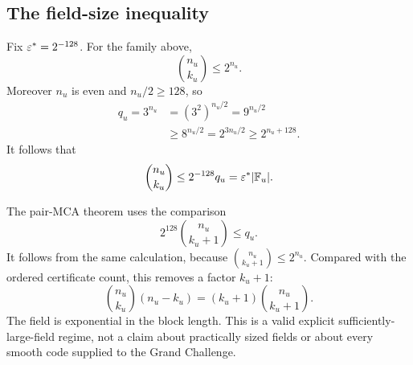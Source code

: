 \subsection{The field-size inequality}
\label{sec:field-inequality}

Fix \(\varepsilon^\ast=2^{-128}\).  For the family above,
\[
  \binom{n_u}{k_u}\le 2^{n_u}.
\]
Moreover \(n_u\) is even and \(n_u/2\ge128\), so
\[
\begin{aligned}
  q_u=3^{n_u}
  &=(3^2)^{n_u/2}
    =9^{n_u/2}                                      \\
  &\ge8^{n_u/2}
    =2^{3n_u/2}
    \ge2^{n_u+128}.
\end{aligned}
\]
It follows that
\[
  \binom{n_u}{k_u}
  \le 2^{-128}q_u
  =\varepsilon^\ast|\mathbb{F}_u|.
\]

The pair-MCA theorem uses the comparison
\[
  2^{128}\binom{n_u}{k_u+1}\le q_u.
\]
It follows from the same calculation, because
\(\binom{n_u}{k_u+1}\le2^{n_u}\).
Compared with the ordered certificate count, this removes a factor \(k_u+1\):
\[
  \binom{n_u}{k_u}(n_u-k_u)
  =(k_u+1)\binom{n_u}{k_u+1}.
\]
The field is exponential in the block length.  This is a valid explicit
sufficiently-large-field regime, not a claim about practically sized fields
or about every smooth code supplied to the Grand Challenge.
